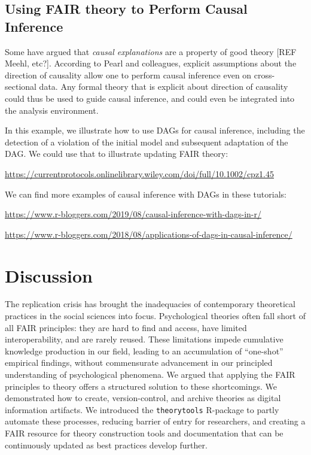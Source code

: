 \documentclass[
  man,floatsintext]{apa6}
\begin{document}
\subsection{Using FAIR theory to Perform Causal Inference}\label{using-fair-theory-to-perform-causal-inference}

Some have argued that \emph{causal explanations} are a property of good theory {[}REF Meehl, etc?{]}.
According to Pearl and colleagues,
explicit assumptions about the direction of causality allow one to perform causal inference even on cross-sectional data.
Any formal theory that is explicit about direction of causality could thus be used to guide causal inference,
and could even be integrated into the analysis environment.

In this example, we illustrate how to use DAGs for causal inference, including the detection of a violation of the initial model and subsequent adaptation of the DAG. We could use that to illustrate updating FAIR theory:

\url{https://currentprotocols.onlinelibrary.wiley.com/doi/full/10.1002/cpz1.45}

We can find more examples of causal inference with DAGs in these tutorials:

\url{https://www.r-bloggers.com/2019/08/causal-inference-with-dags-in-r/}

\url{https://www.r-bloggers.com/2018/08/applications-of-dags-in-causal-inference/}

\section{Discussion}\label{discussion}

The replication crisis has brought the inadequacies of contemporary theoretical practices in the social sciences into focus.
Psychological theories often fall short of all FAIR principles: they are hard to find and access, have limited interoperability, and are rarely reused.
These limitations impede cumulative knowledge production in our field,
leading to an accumulation of ``one-shot'' empirical findings, without commensurate advancement in our principled understanding of psychological phenomena.
We argued that applying the FAIR principles to theory offers a structured solution to these shortcomings.
We demonstrated how to create, version-control, and archive theories as digital information artifacts.
We introduced the \texttt{theorytools} R-package to partly automate these processes, reducing barrier of entry for researchers,
and creating a FAIR resource for theory construction tools and documentation that can be continuously updated as best practices develop further.
\end{document}
